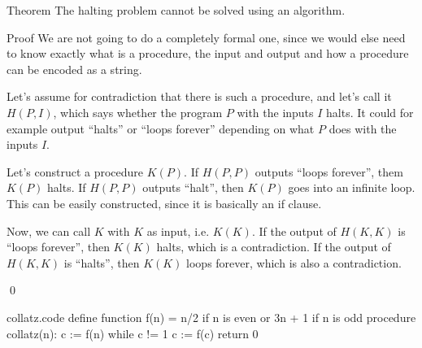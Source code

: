 \documentclass[a4paper]{article}
\begin{document}
\begin{parag}{Theorem}
    The halting problem cannot be solved using an algorithm.

    \begin{subparag}{Proof}
        We are not going to do a completely formal one, since we would else need to know exactly what is a procedure, the input and output and how a procedure can be encoded as a string.

        \vspace{1em}

        Let's assume for contradiction that there is such a procedure, and let's call it $H\left(P, I\right)$, which says whether the program $P$ with the inputs $I$ halts. It could for example output ``halts'' or ``loops forever'' depending on what $P$ does with the inputs $I$.

        Let's construct a procedure $K\left(P\right)$. If $H\left(P, P\right)$ outputs ``loops forever'', them $K\left(P\right)$ halts. If $H\left(P, P\right)$ outputs ``halt'', then $K\left(P\right)$ goes into an infinite loop. This can be easily constructed, since it is basically an if clause.


        Now, we can call $K$ with $K$ as input, i.e. $K\left(K\right)$. If the output of $H\left(K, K\right)$ is ``loops forever'', then $K\left(K\right)$ halts, which is a contradiction. If the output of $H\left(K, K\right)$ is ``halts'', then $K\left(K\right)$ loops forever, which is also a contradiction.

        \qed
    \end{subparag}
\end{parag}

\begin{filecontents*}[overwrite]{collatz.code}
define function f(n) = n/2 if n is even or 3n + 1 if n is odd
procedure collatz(n):
    c := f(n)
    while c != 1
        c := f(c)
    return 0
\end{filecontents*}
\end{document}
